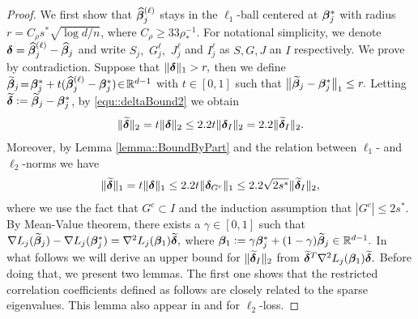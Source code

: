 \documentclass[twoside,11pt]{article}
\newcommand{\defeq}{\vcentcolon=}
\newcommand*{\BR}{\mathbb{R}}
\newcommand*{\tbdelta}{\tilde \bdelta}
\newcommand*{\hbbeta}{\hat{\bbeta}}
\newcommand*{\tbbeta}{\tilde{\bbeta}}
\newcommand*{\gradstarss} {\nabla {L_j}(\bbeta^*_{j})}
\newcommand*{\tgradss}{\nabla {L_j}(\tbbeta_{j})}
\newcommand*{\hbbetas}{\hat{\bbeta}_{j}}
\newcommand*{\tbbetas}{\tilde{\bbeta}_{j}}
\newcommand*{\bbetass}{\bbeta^*_{j}}
\begin{document}
\begin{proof} 
We first show that $\hbbetas^{(\ell)}$ stays in the $\ell_1$-ball centered at $\bbetass$ with radius $r = C_\rho s^* \sqrt{\log d/n}$, where $C_\rho \geq 33 \rho_*^{-1}$. For notational simplicity, we denote $\bdelta = \hbbeta_j^{(\ell)} - \hbbeta_j$ and write  $S_j,$ $G_j^\ell, $ $J_j^\ell$ and $I_j^\ell$ as $S, G, J$ an $I$ respectively. We prove by contradiction. Suppose that $ \| \bm{\delta} \|_1   > r, $
then we define $\tbbetas  \!=\! \bbetass + t (\hbbetas^{(\ell)} - \bbetass)\!\in\! \BR^{d-1} $ with $t \in [0,1]$ 
such that $ \big\| \tbbetas -\bbetass\big\|_1 \leq r.$ 
Letting $\tbdelta \defeq \tbbetas - \bbetass$,
 by \eqref{equ::deltaBound2} we obtain 
 \begin{align}\label{equ::tildeDeltaI}
\|\tbdelta \|_2 = t \|\bdelta\|_2 \leq 2.2 t \|\bdelta_I \|_2 = 2.2 \|\tbdelta_I \|_2.
 \end{align}
 Moreover, by Lemma \eqref{lemma::BoundByPart} and the relation between $\ell_1$- and $\ell_2$-norms
 we have 
 \begin{align}\label{equ::tildeG1}
 \|\tbdelta\|_1 = t  \|\bdelta\|_1 \leq 2.2t\|\bdelta_{G^c}\|_1 \leq 2.2\sqrt{2s^*} \|\tbdelta_I \|_2,
 \end{align}
 where we use the fact that $G^c \subset I$ and the induction assumption that $|G^c|\leq 2s^*.$
 By Mean-Value theorem, there exists a $\gamma \in [0,1]$ such that $
\tgradss - \gradstarss = \nabla^2  L_j (\bbeta_1)\tbdelta, 
$
where $\bbeta_1 \defeq \gamma \bbetass + (1- \gamma) \tbbetas \in \BR^{d-1}.$  In what follows we will derive an upper bound for $ \| \tbdelta _I  \|_2 $ from $ \tbdelta^T \nabla^2  L_j(\bbeta_1)\tbdelta.$ Before doing that, we present two lemmas.  The first one shows that the  restricted correlation coefficients defined as follows are closely related to 
the sparse eigenvalues. This lemma also appear in \cite{zhang2010analysis} and \cite{zhang2013multi} for $\ell_2$-loss.


\end{proof}
\end{document}
